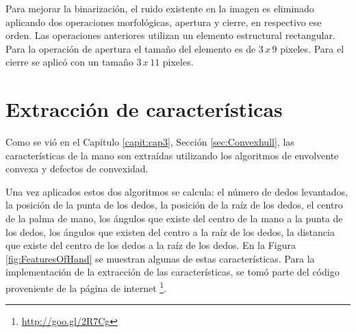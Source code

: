 Para mejorar la binarizaci\'on, el ruido existente en la imagen es eliminado aplicando dos operaciones morfológicas, apertura y cierre, en respectivo ese orden. Las operaciones anteriores utilizan un elemento estructural rectangular. Para la operación de apertura el tamaño del elemento es de $3 \, x \, 9$ pixeles. Para el cierre se aplic\'o con un tamaño  $3\, x \, 11$ pixeles.



\section{Extracción de características}\label{sec:ExtraccionCaracteristicasSystem}

Como se vi\'o en el Capítulo \ref{capit:cap3}, Sección \ref{sec:Convexhull}, las características de la mano son extraídas utilizando los algoritmos de envolvente convexa y  defectos de convexidad.


Una vez aplicados estos dos algoritmos se calcula: el número de dedos levantados, la posición de la punta de los dedos, la posición de la raíz de los dedos, el centro de la palma de mano, los ángulos que existe del centro de la mano a la punta de los dedos, los ángulos que existen del centro a la raíz de los dedos, la distancia que existe del centro de los dedos a la raíz de los dedos. En la Figura \ref{fig:FeaturesOfHand} se muestran algunas de estas características. Para la implementación de la extracción de las características, se tom\'o parte del código proveniente de la p\'agina de internet \footnote{\url{http://goo.gl/2R7Cg}}. 

